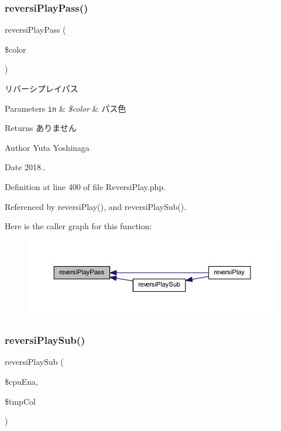 \subsubsection{\texorpdfstring{reversi\+Play\+Pass()}{reversiPlayPass()}}
{\footnotesize\ttfamily reversi\+Play\+Pass (\begin{DoxyParamCaption}\item[{}]{\$color }\end{DoxyParamCaption})}



リバーシプレイパス 


\begin{DoxyParams}[1]{Parameters}
\mbox{\tt in}  & {\em \$color} & パス色 \\
\hline
\end{DoxyParams}
\begin{DoxyReturn}{Returns}
ありません 
\end{DoxyReturn}
\begin{DoxyAuthor}{Author}
Yuta Yoshinaga 
\end{DoxyAuthor}
\begin{DoxyDate}{Date}
2018.. 
\end{DoxyDate}


Definition at line 400 of file Reversi\+Play.\+php.



Referenced by reversi\+Play(), and reversi\+Play\+Sub().

Here is the caller graph for this function\+:\nopagebreak
\begin{figure}[H]
\begin{center}
\leavevmode
\includegraphics[width=350pt]{class_reversi_play_a67816fe65a87e35d8e8cc35d5d269bcb_icgraph}
\end{center}
\end{figure}
\mbox{\label{class_reversi_play_a990fc6e45b7bdf2dab569f087f8b5a62}} 
\subsubsection{\texorpdfstring{reversi\+Play\+Sub()}{reversiPlaySub()}}
{\footnotesize\ttfamily reversi\+Play\+Sub (\begin{DoxyParamCaption}\item[{}]{\$cpu\+Ena,  }\item[{}]{\$tmp\+Col }\end{DoxyParamCaption})}



